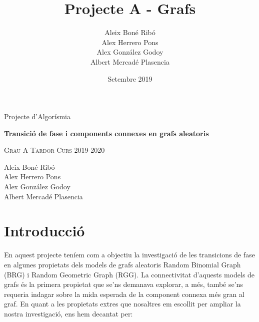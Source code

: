 



%

\title{Projecte A - Grafs}
\author{
Aleix Boné Ribó\\
Alex Herrero Pons\\
Alex González Godoy\\
Albert Mercadé Plasencia\\
}
\date{Setembre 2019}



\thispagestyle{empty}
\clearpage
\setcounter{page}{-1}

\begin{titlepage}
{
    \centering
    \null
    \vfill
    {\Large Projecte d'Algorísmia\par}
    \vspace{2em}
    {\Huge \bfseries 
    Transició de fase i components connexes en grafs aleatoris
    \par}
    \vspace{2em}
    {\large \scshape 
    Grau A \qquad Tardor Curs 2019-2020
    \par}
    \vfill
\begin{center}
    
\end{center}
    \vspace{3cm}

    \vfill
    {\raggedleft \large
Aleix Boné Ribó\\
Alex Herrero Pons\\
Alex González Godoy\\
Albert Mercadé Plasencia\\
        \par}
}
\end{titlepage}

\pagebreak
{} 

\tableofcontents
\pagebreak
{} 

\section{Introducció}

En aquest projecte teníem com a objectiu la investigació de les transicions de fase en algunes propietats dels models de grafs aleatoris Random Binomial Graph (BRG) i Random Geometric Graph (RGG). La connectivitat d'aquests models de grafs és la primera propietat que se'ns demanava explorar, a més, també se'ns requeria indagar sobre la mida esperada de la component connexa més gran al graf. En quant a les propietats extres que nosaltres em escollit per ampliar la nostra investigació, ens hem decantat per:

